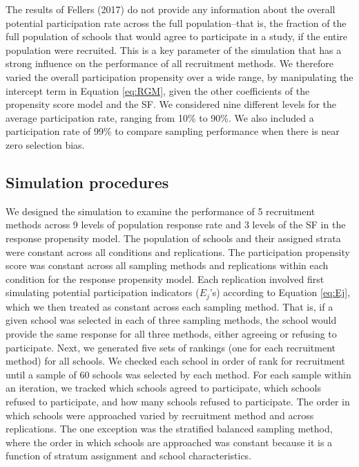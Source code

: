 \documentclass[
  english,
  man,floatsintext]{apa6}
\begin{document}
The results of Fellers (2017) do not provide any information about the overall potential participation rate across the full population--that is, the fraction of the full population of schools that would agree to participate in a study, if the entire population were recruited. This is a key parameter of the simulation that has a strong influence on the performance of all recruitment methods. We therefore varied the overall participation propensity over a wide range, by manipulating the intercept term in Equation \eqref{eq:RGM}, given the other coefficients of the propensity score model and the SF. We considered nine different levels for the average participation rate, ranging from 10\% to 90\%. We also included a participation rate of 99\% to compare sampling performance when there is near zero selection bias.

\hypertarget{simulation-procedures}{%
\subsection{Simulation procedures}\label{simulation-procedures}}

We designed the simulation to examine the performance of 5 recruitment methods across 9 levels of population response rate and 3 levels of the SF in the response propensity model. The population of schools and their assigned strata were constant across all conditions and replications. The participation propensity score was constant across all sampling methods and replications within each condition for the response propensity model. Each replication involved first simulating potential participation indicators (\(E_j\)'s) according to Equation \eqref{eq:Ej}, which we then treated as constant across each sampling method. That is, if a given school was selected in each of three sampling methods, the school would provide the same response for all three methods, either agreeing or refusing to participate. Next, we generated five sets of rankings (one for each recruitment method) for all schools.
We checked each school in order of rank for recruitment until a sample of 60 schools was selected by each method. For each sample within an iteration, we tracked which schools agreed to participate, which schools refused to participate, and how many schools refused to participate.
The order in which schools were approached varied by recruitment method and across replications. The one exception was the stratified balanced sampling method, where the order in which schools are approached was constant because it is a function of stratum assignment and school characteristics.
\end{document}
